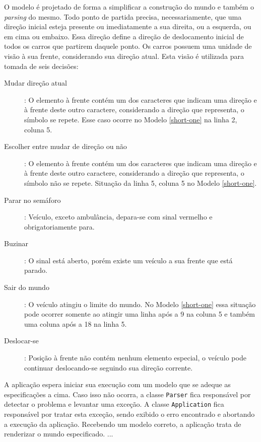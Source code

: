 O modelo é projetado de forma a simplificar a construção do mundo e
também o \textit{parsing} do mesmo. Todo ponto de partida precisa,
necessariamente, que uma direção inicial esteja presente ou
imediatamente a sua direita, ou a esquerda, ou em cima ou
embaixo. Essa direção define a direção de deslocamento inicial de
todos os carros que partirem daquele ponto. Os carros possuem uma
unidade de visão à sua frente, considerando sua direção atual. Esta
visão é utilizada para tomada de seis decisões:
\begin{description}
\item[Mudar direção atual]: O elemento à frente contém um dos
  caracteres que indicam uma direção e à frente deste outro caractere,
  considerando a direção que representa, o símbolo se repete. Esse
  caso ocorre no Modelo \ref{short-one} na linha 2, coluna 5.
\item[Escolher entre mudar de direção ou não]: O elemento à frente
  contém um dos caracteres que indicam uma direção e à frente deste
  outro caractere, considerando a direção que representa, o símbolo
  não se repete. Situação da linha 5, coluna 5 no Modelo \ref{short-one}.
\item[Parar no semáforo]: Veículo, exceto ambulância, depara-se com
  sinal vermelho e obrigatoriamente para.
\item[Buzinar]: O sinal está aberto, porém existe um veículo a sua
  frente que está parado.
\item[Sair do mundo]: O veículo atingiu o limite do mundo. No Modelo
  \ref{short-one} essa situação pode ocorrer somente ao atingir uma
  linha após a 9 na coluna 5 e também uma coluna após a 18 na linha 5.
\item[Deslocar-se]: Posição à frente não contém nenhum elemento
  especial, o veículo pode continuar deslocando-se seguindo sua
  direção corrente.
\end{description}

A aplicação espera iniciar sua execução com um modelo que se adeque as
especificações a cima. Caso isso não ocorra, a classe \verb!Parser!
fica responsável por detectar o problema e levantar uma exceção. A
classe \verb!Application! fica responsável por tratar esta exceção,
sendo exibido o erro encontrado e abortando a execução da aplicação.
Recebendo um modelo correto, a aplicação trata de renderizar o mundo
especificado. ...
